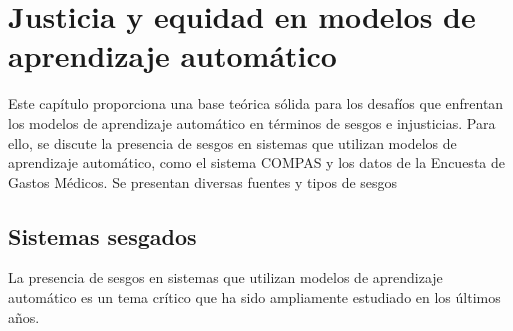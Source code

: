\chapter{Justicia y equidad en modelos de aprendizaje autom\'atico}\label{chapter:state-of-the-art}



Este cap\'itulo proporciona una base te\'orica s\'olida para los desaf\'ios que enfrentan los modelos de aprendizaje autom\'atico en t\'erminos
de sesgos e injusticias. Para ello, se discute la presencia de sesgos en sistemas que utilizan modelos de aprendizaje autom\'atico, como 
el sistema COMPAS y los datos de la Encuesta de Gastos M\'edicos. Se presentan diversas fuentes y tipos de sesgos

\section{Sistemas sesgados}

    La presencia de sesgos en sistemas que utilizan modelos de aprendizaje autom\'atico es un tema cr\'itico que ha sido
    ampliamente estudiado en los \'ultimos a\~nos. 
    
